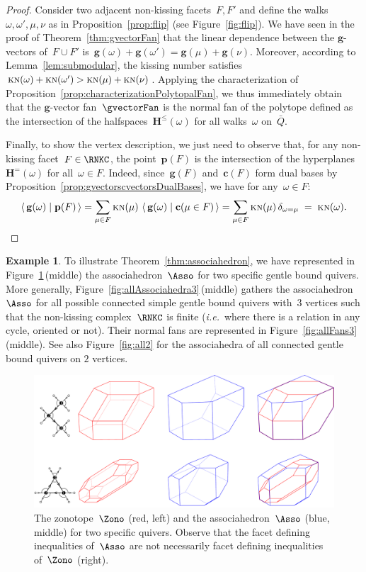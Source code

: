 \documentclass{amsart}
\theoremstyle{definition}
\newtheorem{example}[theorem]{Example}
\renewcommand{\b}[1]{\mathbf{#1}} %
\newcommand{\dotprod}[2]{\left\langle \, #1 \; \middle| \; #2 \, \right\rangle} %
\newcommand{\fref}[1]{Figure~\ref{#1}} %
\newcommand{\ie}{\textit{i.e.}~} %
\newcommand{\KN}{\textsc{kn}} %
\newcommand{\gvector}[1]{\mathbf{g}(#1)} %
\newcommand{\gvectors}[1]{\mathbf{g}(#1)} %
\newcommand{\cvector}[2]{\mathbf{c}(#1 \in #2)} %
\newcommand{\cvectors}[1]{\mathbf{c}(#1)} %
\newcommand{\point}[1]{\mathbf{p}(#1)} %
\newcommand{\HS}[1]{\mathbf{H}^{\le}(#1)} %
\newcommand{\Hyp}[1]{\mathbf{H}^{=}(#1)} %
\begin{document}
\begin{proof}
Consider two adjacent non-kissing facets~$F,F'$ and define the walks~$\omega, \omega', \mu, \nu$ as in Proposition~\ref{prop:flip} (see \fref{fig:flip}).
We have seen in the proof of Theorem~\ref{thm:gvectorFan} that the linear dependence between the $\b{g}$-vectors of~$F \cup F'$ is~$\gvector{\omega} + \gvector{\omega'} = \gvector{\mu} + \gvector{\nu}$.
Moreover, according to Lemma~\ref{lem:submodular}, the kissing number satisfies~$\KN(\omega) + \KN(\omega') > \KN(\mu) + \KN(\nu)$.
Applying the characterization of Proposition~\ref{prop:characterizationPolytopalFan}, we thus immediately obtain that the $\b{g}$-vector fan~$\gvectorFan$ is the normal fan of the polytope defined as the intersection of the halfspaces~$\HS{\omega}$ for all walks~$\omega$ on~$\bar Q$.

Finally, to show the vertex description, we just need to observe that, for any non-kissing facet~$F \in \RNKC$, the point~$\point{F}$ is the intersection of the hyperplanes~$\Hyp{\omega}$ for all~$\omega \in F$.
Indeed, since~$\gvectors{F}$ and~$\cvectors{F}$ form dual bases by Proposition~\ref{prop:gvectorscvectorsDualBases}, we have for any~$\omega \in F$:
\[
\dotprod{\gvector{\omega}}{\point{F}} = \sum_{\mu \in F} \KN(\mu) \, \dotprod{\gvector{\omega}}{\cvector{\mu}{F}} = \sum_{\mu \in F} \KN(\mu) \, \delta_{\omega = \mu} \; = \; \KN(\omega).
\qedhere
\]
\end{proof}

\begin{example}
To illustrate Theorem~\ref{thm:associahedron}, we have represented in \fref{fig:exmAssociahedra}\,(middle) the associahedron~$\Asso$ for two specific gentle bound quivers.
More generally, \fref{fig:allAssociahedra3}\,(middle) gathers the associahedron~$\Asso$ for all possible connected simple gentle bound quivers with~$3$ vertices such that the non-kissing complex~$\RNKC$ is finite (\ie where there is a relation in any cycle, oriented or not).
Their normal fans are represented in \fref{fig:allFans3}\,(middle).
See also \fref{fig:all2} for the associahedra of all connected gentle bound quivers on $2$ vertices.

\begin{figure}[t]
	\capstart
	\centerline{\includegraphics[width=1.1\textwidth]{exmAssociahedra}}
	\caption{The zonotope~$\Zono$ (red, left) and the associahedron~$\Asso$ (blue, middle) for two specific quivers. Observe that the facet defining inequalities of~$\Asso$ are not necessarily facet defining inequalities of~$\Zono$ (right).}
	\label{fig:exmAssociahedra}
\end{figure}
\end{example}
\end{document}
